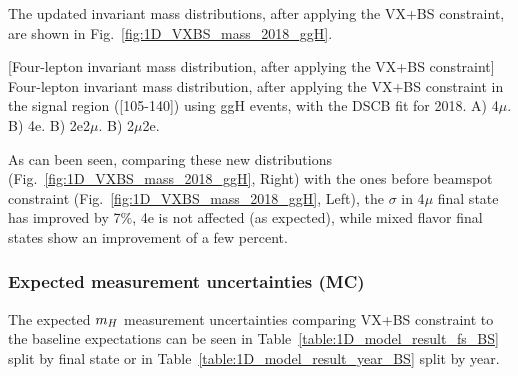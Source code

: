 The updated invariant mass distributions, after applying the VX+BS constraint, are shown in Fig.~\ref{fig:1D_VXBS_mass_2018_ggH}.
\begin{multiFigure}
    \centering
            [Four-lepton invariant mass distribution, after applying the VX+BS constraint]
            {Four-lepton invariant mass distribution, after applying the VX+BS constraint in the signal region ([105-140]\GeV) using ggH events, with the DSCB fit for 2018.
            \;A) 4$\mu$.    %
            \;B) 4e.
            \;B) 2e2$\mu$.
            \;B) 2$\mu$2e.
            }
    \label{fig:1D_VXBS_mass_2018_ggH}
    \end{multiFigure}
As can been seen, comparing these new distributions (Fig.~\ref{fig:1D_VXBS_mass_2018_ggH}, Right) with the ones before beamspot constraint (Fig.~\ref{fig:1D_VXBS_mass_2018_ggH}, Left), the $\sigma$ in 4$\mu$ final state has improved by 7$\%$, 4e is not affected (as expected), while mixed flavor final states show an improvement of a few percent.

\subsubsection{Expected \mH measurement uncertainties (MC)}
The expected $m_{H}$ measurement uncertainties comparing VX+BS constraint to the baseline expectations can be seen in Table~\ref{table:1D_model_result_fs_BS} split by final state or in Table~\ref{table:1D_model_result_year_BS} split by year.

